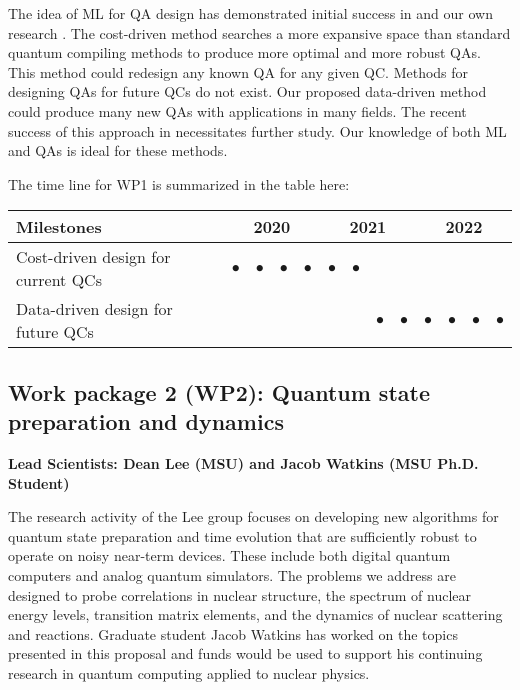\documentclass[10pt]{article}
\begin{document}
The idea of ML for QA design has demonstrated initial success in \cite{Mitarai2018,Cincio2018} and our own research \cite{Khatri2018}. The cost-driven method searches a more expansive space than standard quantum compiling methods to produce more optimal and more robust QAs. This method could redesign any known QA for any given QC.
Methods for designing QAs for future QCs do not exist. Our proposed data-driven method could produce many new QAs with applications in many fields. The recent success of this approach in \cite{Cincio2018} necessitates further study. Our knowledge of both ML and QAs is ideal for these methods.


The time line for WP1 is summarized in the table here:
\begin{footnotesize}
\begin{center}
\begin{tabular}{|l|c|c|c|c|c|c|c|c|c|c|c|c|}
\hline
\multicolumn{1}{|l}{Milestones } & \multicolumn{4}{|c|}{ 2020 } & \multicolumn{4}{c|}{ 2021 } & \multicolumn{4}{c|}{ 2022 } \\
\hline
Cost-driven design for current QCs &$\bullet$ &$\bullet$ &$\bullet$ &$\bullet$ & $\bullet$ & $\bullet$& & & & & & \\
\hline
Data-driven design for future QCs & & & & & & & $\bullet$ & $\bullet$ & $\bullet$ &$\bullet$ &$\bullet$ &$\bullet$ \\
\hline
\end{tabular}
\end{center}
\end{footnotesize}



\subsection{Work package 2 (WP2): Quantum state preparation and dynamics}
{\bf Lead Scientists: Dean Lee (MSU) and Jacob Watkins (MSU Ph.D. Student)}

The research activity of the Lee group focuses on developing new algorithms for quantum state preparation and time evolution that are sufficiently robust to operate on noisy near-term devices.  These include both digital quantum computers and analog quantum simulators.  The problems we address are designed to probe correlations in nuclear structure, the spectrum of nuclear energy levels, transition matrix elements, and the dynamics of nuclear scattering and reactions.  Graduate  student Jacob Watkins has worked on the topics presented in this proposal and funds would be used to support his continuing research in quantum computing applied to nuclear physics. 
\end{document}
